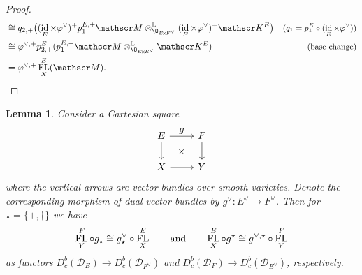 \documentclass[JEP,XML,SOM,Unicode,published]{cedram}
\let\ts\textstyle
\newtheorem{lem}[thm]{Lemma}
\DeclareMathOperator{\FL}{\textup{FL}}
\DeclareMathOperator{\id}{\textup{id}}
\begin{document}
\begin{proof}
\begin{align*}
&\cong q_{2,+} \big((\id_E \times \varphi^\vee)^+ p_1^{E,+} \mathscr M \otimes^{\mathbb L}_{\O_{E\!\times\!F^\vee}} (\id_E \times \varphi^\vee)^+ \mathscr K^E\big) & \text{\small ($q_1 = p_1^E \circ (\id_E \times \varphi^\vee)$)}\\
&\cong \varphi^{\vee,+} p^E_{2,+} (p_1^{E,+} \mathscr M \otimes^{\mathbb L}_{\O_{E\!\times\!E^\vee}} \mathscr K^E) & \text{\small (base change)}\\
&= \varphi^{\vee,+} \FL_X^E(\mathscr M). & \qedhere
\end{align*}
\end{proof}

\begin{lem} \label{lem:FLCartesian}
Consider a Cartesian square\vspace*{-5pt}\enlargethispage{1.5\baselineskip}
\[
\begin{tikzcd}
E \ar{r}{\ts \ts g} \ar{d} \ar[phantom]{dr}{\times} & F \ar{d} \\
X \ar{r} & Y
\end{tikzcd}
\]
where the vertical arrows are vector bundles over smooth varieties. Denote the corresponding morphism of dual vector bundles by $g^\vee \colon E^\vee \to F^\vee$. Then for
$\star=\{+,\dag\}$ we have\vspace*{-5pt}
\[
\FL_Y^F \circ g_\star \cong g^\vee_\star \circ \FL_X^E \qquad \text{and} \qquad
\FL_X^E \circ g^\star \cong g^{\vee,\star} \circ \FL_Y^F
\]
as functors $D_{c}^b(\mathscr D_E) \to D_{c}^b(\mathscr D_{F^\vee})$ and $D_{c}^b(\mathscr D_F) \to D_{c}^b(\mathscr D_{E^\vee})$, respectively.
\end{lem}
\end{document}
